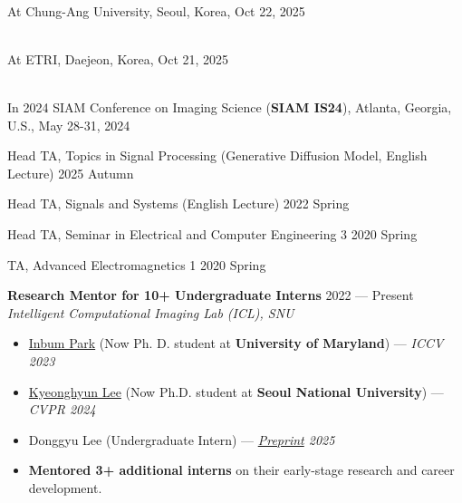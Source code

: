 \begin{cvcontent}
\\
At Chung-Ang University, Seoul, Korea, Oct 22, 2025

\\
At ETRI, Daejeon, Korea, Oct 21, 2025

\\
In 2024 SIAM Conference on Imaging Science (\textbf{SIAM IS24}), Atlanta, Georgia, U.S., May 28-31, 2024

\end{cvcontent}
\begin{cvcontent}
Head TA, Topics in Signal Processing (Generative Diffusion Model, English Lecture) \hfill 2025 Autumn

Head TA, Signals and Systems (English Lecture) \hfill 2022 Spring

Head TA, Seminar in Electrical and Computer Engineering 3 \hfill 2020 Spring

TA, Advanced Electromagnetics 1 \hfill 2020 Spring
\end{cvcontent}

\begin{cvcontent}
\textbf{Research Mentor for 10+ Undergraduate Interns} \hfill 2022 --- Present \\
\textit{Intelligent Computational Imaging Lab (ICL), SNU}

\begin{itemize}[leftmargin=1.5em, itemsep=0.3ex]
    \item \href{https://inbumpark.github.io/}{Inbum Park} (Now Ph. D. student at \textbf{University of Maryland}) --- \textit{ICCV 2023}
    \item \href{https://scholar.google.com/citations?user=guC7J3YAAAAJ&hl=ko}{Kyeonghyun Lee} (Now Ph.D. student at \textbf{Seoul National University}) --- \textit{CVPR 2024}
    \item Donggyu Lee (Undergraduate Intern) --- \textit{\href{https://dx.doi.org/10.2139/ssrn.5397023}{Preprint} 2025}
    \item \textbf{Mentored 3+ additional interns} on their early-stage research and career development.
\end{itemize}
\end{cvcontent}

